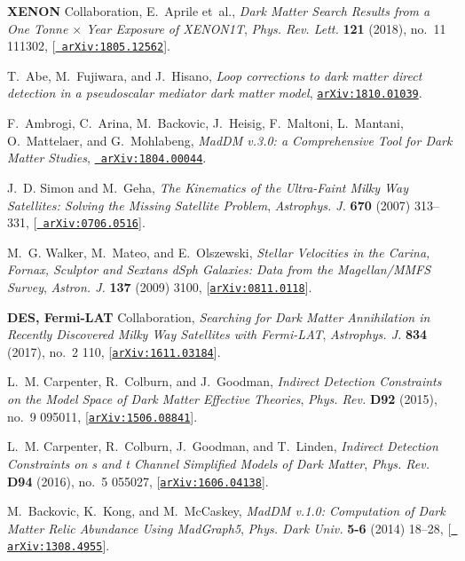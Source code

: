 \documentclass[a4paper, 11pt,notoc]{article}
\begin{document}
\begin{thebibliography}{100}
{\bf XENON} Collaboration, E.~Aprile et~al., {\it {Dark Matter Search Results
  from a One Tonne $\times$ Year Exposure of XENON1T}}, {\em Phys. Rev. Lett.} {\bf 121}
  (2018), no.~11 111302, [\href{http://arxiv.org/abs/1805.12562}{{\tt
  arXiv:1805.12562}}].

T.~Abe, M.~Fujiwara, and J.~Hisano, {\it {Loop corrections to dark matter
  direct detection in a pseudoscalar mediator dark matter model}},
  \href{http://arxiv.org/abs/1810.01039}{{\tt arXiv:1810.01039}}.

F.~Ambrogi, C.~Arina, M.~Backovic, J.~Heisig, F.~Maltoni, L.~Mantani,
  O.~Mattelaer, and G.~Mohlabeng, {\it {MadDM v.3.0: a Comprehensive Tool for
  Dark Matter Studies}},  \href{http://arxiv.org/abs/1804.00044}{{\tt
  arXiv:1804.00044}}.

J.~D. Simon and M.~Geha, {\it {The Kinematics of the Ultra-Faint Milky Way
  Satellites: Solving the Missing Satellite Problem}},  {\em Astrophys. J.}
  {\bf 670} (2007) 313--331, [\href{http://arxiv.org/abs/0706.0516}{{\tt
  arXiv:0706.0516}}].

M.~G. Walker, M.~Mateo, and E.~Olszewski, {\it {Stellar Velocities in the
  Carina, Fornax, Sculptor and Sextans dSph Galaxies: Data from the
  Magellan/MMFS Survey}},  {\em Astron. J.} {\bf 137} (2009) 3100,
  [\href{http://arxiv.org/abs/0811.0118}{{\tt arXiv:0811.0118}}].

{\bf DES, Fermi-LAT} Collaboration, {\it {Searching for Dark
  Matter Annihilation in Recently Discovered Milky Way Satellites with
  Fermi-LAT}},  {\em Astrophys. J.} {\bf 834} (2017), no.~2 110,
  [\href{http://arxiv.org/abs/1611.03184}{{\tt arXiv:1611.03184}}].
  
L.~M. Carpenter, R.~Colburn, and J.~Goodman, {\it {Indirect Detection
  Constraints on the Model Space of Dark Matter Effective Theories}},  {\em
  Phys. Rev.} {\bf D92} (2015), no.~9 095011,
  [\href{http://arxiv.org/abs/1506.08841}{{\tt arXiv:1506.08841}}].

L.~M. Carpenter, R.~Colburn, J.~Goodman, and T.~Linden, {\it {Indirect
  Detection Constraints on s and t Channel Simplified Models of Dark Matter}},
  {\em Phys. Rev.} {\bf D94} (2016), no.~5 055027,
  [\href{http://arxiv.org/abs/1606.04138}{{\tt arXiv:1606.04138}}].

M.~Backovic, K.~Kong, and M.~McCaskey, {\it {MadDM v.1.0: Computation of Dark
  Matter Relic Abundance Using MadGraph5}},  {\em Phys. Dark Univ.} {\bf 5-6}
  (2014) 18--28, [\href{http://arxiv.org/abs/1308.4955}{{\tt
  arXiv:1308.4955}}].


\end{thebibliography}
\end{document}
